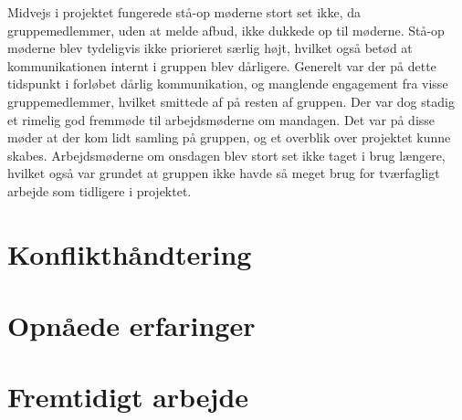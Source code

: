 Midvejs i projektet fungerede stå-op møderne stort set ikke, da gruppemedlemmer, uden at melde afbud, ikke dukkede op til møderne. Stå-op møderne blev tydeligvis ikke priorieret særlig højt, hvilket også betød at kommunikationen internt i gruppen blev dårligere. Generelt var der på dette tidspunkt i forløbet dårlig kommunikation, og manglende engagement fra visse gruppemedlemmer, hvilket smittede af på resten af gruppen.  
Der var dog stadig et rimelig god fremmøde til arbejdsmøderne om mandagen. Det var på disse møder at der kom lidt samling på gruppen, og et overblik over projektet kunne skabes. Arbejdsmøderne om onsdagen blev stort set ikke taget i brug længere, hvilket også var grundet at gruppen ikke havde så meget brug for tværfagligt arbejde som tidligere i projektet.

\section*{Konflikthåndtering}

\section*{Opnåede erfaringer}

\section*{Fremtidigt arbejde}